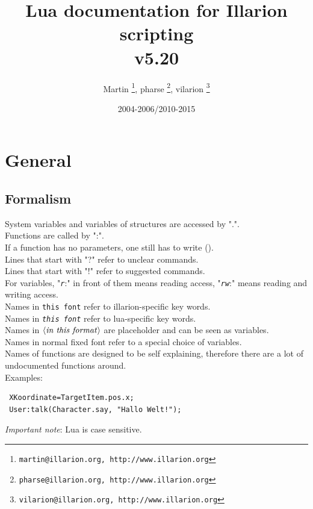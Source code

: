 \documentclass[a4paper,10pt,makeidx]{scrreprt}
\newcommand{\comm}[1]{\index{#1}\texttt{#1}}
\newcommand{\var}[1]{$\left\langle \text{\emph{#1}} \right\rangle$}
\newcommand{\lua}[1]{\index{#1}\texttt{\emph{#1}}}
\begin{document}
\lstset{basicstyle=\small, keywordstyle=\ttfamily, identifierstyle=\ttfamily}
\title{Lua documentation for Illarion scripting\\v5.20}
\author{Martin \thanks{ \texttt{martin@illarion.org, http://www.illarion.org}},
pharse \thanks{ \texttt{pharse@illarion.org, http://www.illarion.org}},
vilarion \thanks{ \texttt{vilarion@illarion.org, http://www.illarion.org}}}
\date{2004-2006/2010-2015}
\maketitle
\tableofcontents
\chapter{General}
\section{Formalism}
System variables and variables of structures are accessed by ".".\\
Functions are called by ":".\\
If a function has no parameters, one still has to write ().\\
Lines that start with "?" refer to unclear commands.\\
Lines that start with "!" refer to suggested commands.\\
For variables, "\lua{r}:" in front of them means reading access, "\lua{rw}:" means reading and writing access.\\
Names in \comm{this font} refer to illarion-specific key words.\\
Names in \lua{this font} refer to lua-specific key words.\\
Names in \var{in this format} are placeholder and can be seen as variables.\\
Names in normal fixed font refer to a special choice of variables.\\
Names of functions are designed to be self explaining, therefore there are a lot of undocumented functions around.\\

Examples:\\
\begin{verbatim}
 XKoordinate=TargetItem.pos.x;
 User:talk(Character.say, "Hallo Welt!");
\end{verbatim}
\emph{Important note}: Lua is case sensitive.
\end{document}
